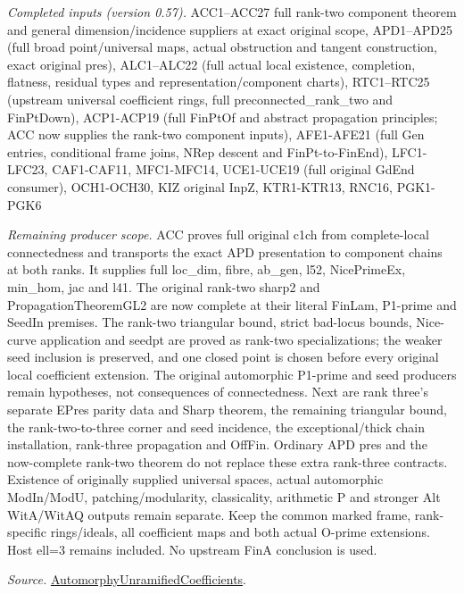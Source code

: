 \documentclass[11pt,a4paper]{article}
\numberwithin{equation}{section}
\theoremstyle{remark}\newtheorem{remark}[theorem]{Remark}
\begin{document}
\emph{Completed inputs (version 0.57).} ACC1–ACC27 full rank-two component theorem and general dimension/incidence suppliers at exact original scope, APD1–APD25 (full broad point/universal maps, actual obstruction and tangent construction, exact original pres), ALC1–ALC22 (full actual local existence, completion, flatness, residual types and representation/component charts), RTC1–RTC25 (upstream universal coefficient rings, full preconnected\_\allowbreak rank\_\allowbreak two and FinPtDown), ACP1-ACP19 (full FinPtOf and abstract propagation principles; ACC now supplies the rank-two component inputs), AFE1-AFE21 (full Gen entries, conditional frame joins, NRep descent and FinPt-to-FinEnd), LFC1-LFC23, CAF1-CAF11, MFC1-MFC14, UCE1-UCE19 (full original GdEnd consumer), OCH1-OCH30, KIZ original InpZ, KTR1-KTR13, RNC16, PGK1-PGK6

\emph{Remaining producer scope.} ACC proves full original c1ch from complete-local connectedness and transports the exact APD presentation to component chains at both ranks. It supplies full loc\_\allowbreak dim, fibre, ab\_\allowbreak gen, l52, NicePrimeEx, min\_\allowbreak hom, jac and l41. The original rank-two sharp2 and PropagationTheoremGL2 are now complete at their literal FinLam, P1-prime and SeedIn premises. The rank-two triangular bound, strict bad-locus bounds, Nice-curve application and seedpt are proved as rank-two specializations; the weaker seed inclusion is preserved, and one closed point is chosen before every original local coefficient extension. The original automorphic P1-prime and seed producers remain hypotheses, not consequences of connectedness. Next are rank three's separate EPres parity data and Sharp theorem, the remaining triangular bound, the rank-two-to-three corner and seed incidence, the exceptional/thick chain installation, rank-three propagation and OffFin. Ordinary APD pres and the now-complete rank-two theorem do not replace these extra rank-three contracts. Existence of originally supplied universal spaces, actual automorphic ModIn/ModU, patching/modularity, classicality, arithmetic P and stronger Alt WitA/WitAQ outputs remain separate. Keep the common marked frame, rank-specific rings/ideals, all coefficient maps and both actual O-prime extensions. Host ell=3 remains included. No upstream FinA conclusion is used.

\emph{Source.} \href{https://github.com/CocoSgt/riemann-hypothesis-lean/blob/7cbf7a0c32fca1badf05931879a37c3f8a2b03b4/src/Development/AutomorphicArithmetic/AutomorphicVarieties/AutomorphicCases/AutomorphyUnramifiedCoefficients.lean#L24-L27}{AutomorphyUnramifiedCoefficients}.
\end{document}
